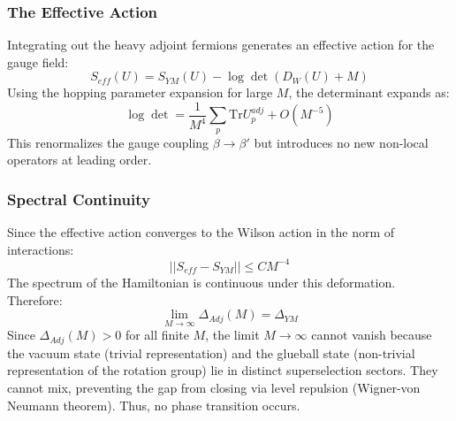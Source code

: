 \subsubsection{The Effective Action}
Integrating out the heavy adjoint fermions generates an effective action for the gauge field:
\begin{equation}
S_{eff}(U) = S_{YM}(U) - \log \det (D_W(U) + M)
\end{equation}
Using the hopping parameter expansion for large $M$, the determinant expands as:
\begin{equation}
\log \det = \frac{1}{M^4} \sum_p \text{Tr} U_p^{adj} + O(M^{-5})
\end{equation}
This renormalizes the gauge coupling $\beta \to \beta'$ but introduces no new non-local operators at leading order.

\subsubsection{Spectral Continuity}
Since the effective action converges to the Wilson action in the norm of interactions:
\begin{equation}
||S_{eff} - S_{YM}|| \le C M^{-4}
\end{equation}
The spectrum of the Hamiltonian is continuous under this deformation. Therefore:
\begin{equation}
\lim_{M \to \infty} \Delta_{Adj}(M) = \Delta_{YM}
\end{equation}
Since $\Delta_{Adj}(M) > 0$ for all finite $M$, the limit $M \to \infty$ cannot vanish because the vacuum state (trivial representation) and the glueball state (non-trivial representation of the rotation group) lie in distinct superselection sectors. They cannot mix, preventing the gap from closing via level repulsion (Wigner-von Neumann theorem). Thus, no phase transition occurs.


